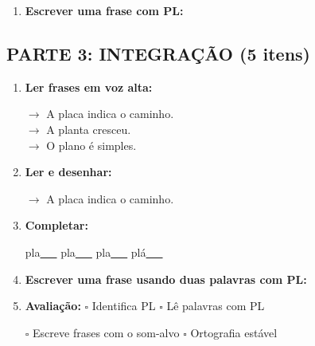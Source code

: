 \begin{exercicio}
\begin{enumerate}[resume]
  \item \textbf{Escrever uma frase com PL:}
  \begin{center}
  \underline{\hspace{12cm}}
  \end{center}

\end{enumerate}

\subsection*{PARTE 3: INTEGRAÇÃO (5 itens)}

\begin{enumerate}[resume]

  \item \textbf{Ler frases em voz alta:}
  \begin{center}
  $\rightarrow$ A placa indica o caminho.\\
  $\rightarrow$ A planta cresceu.\\
  $\rightarrow$ O plano é simples.\\
  \end{center}

  \item \textbf{Ler e desenhar:}
  \begin{center}
  $\rightarrow$ A placa indica o caminho.
  \end{center}
  \begin{center}
  \end{center}

  \item \textbf{Completar:}
  \begin{center}
  pla\underline{~~~} \quad pla\underline{~~~} \quad pla\underline{~~~} \quad plá\underline{~~~}
  \end{center}

  \item \textbf{Escrever uma frase usando duas palavras com PL:}
  \begin{center}
  \underline{\hspace{12cm}}
  \end{center}

  \item \textbf{Avaliação:} $\square$ Identifica PL \quad $\square$ Lê palavras com PL
  \begin{center}
  $\square$ Escreve frases com o som-alvo \quad $\square$ Ortografia estável
  \end{center}


\end{enumerate}
\end{exercicio}
